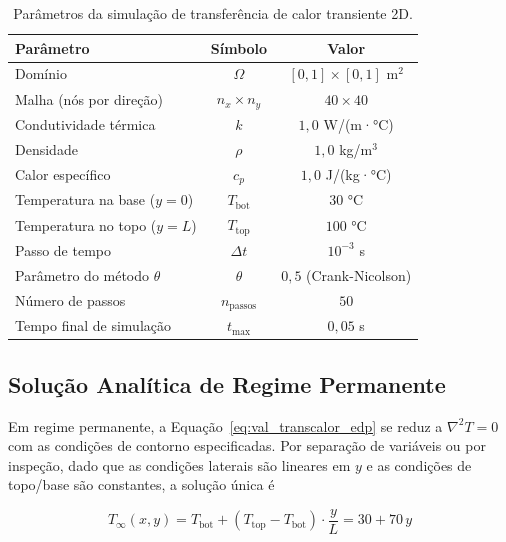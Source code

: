 \begin{table}[htbp]
    \centering
    \caption{Parâmetros da simulação de transferência de calor transiente 2D.}
    \label{tab:val_transcalor_params}
    \begin{tabular}{lcc}
        \hline
        \textbf{Parâmetro} & \textbf{Símbolo} & \textbf{Valor} \\
        \hline
        Domínio                         & $\Omega$     & $[0, 1] \times [0, 1]$ m$^{2}$ \\
        Malha (nós por direção)         & $n_x \times n_y$ & $40 \times 40$             \\
        Condutividade térmica           & $k$          & $1{,}0$ W/(m·°C)               \\
        Densidade                       & $\rho$       & $1{,}0$ kg/m$^3$               \\
        Calor específico                & $c_p$        & $1{,}0$ J/(kg·°C)              \\
        Temperatura na base ($y = 0$)   & $T_{\mathrm{bot}}$ & $30$ °C                  \\
        Temperatura no topo ($y = L$)   & $T_{\mathrm{top}}$ & $100$ °C                 \\
        Passo de tempo                  & $\Delta t$   & $10^{-3}$ s                    \\
        Parâmetro do método $\theta$    & $\theta$     & $0{,}5$ (Crank-Nicolson)       \\
        Número de passos                & $n_{\mathrm{passos}}$ & $50$                  \\
        Tempo final de simulação        & $t_{\max}$   & $0{,}05$ s                     \\
        \hline
    \end{tabular}
\end{table}

\subsection{Solução Analítica de Regime Permanente}

Em regime permanente, a Equação~\eqref{eq:val_transcalor_edp} se reduz a $\nabla^2 T = 0$ com as condições de contorno especificadas. Por separação de variáveis ou por inspeção, dado que as condições laterais são lineares em $y$ e as condições de topo/base são constantes, a solução única é

\begin{equation}
    T_{\infty}(x, y) = T_{\mathrm{bot}} + (T_{\mathrm{top}} - T_{\mathrm{bot}}) \cdot \frac{y}{L} = 30 + 70 \, y
    \label{eq:val_transcalor_analitica}
\end{equation}

